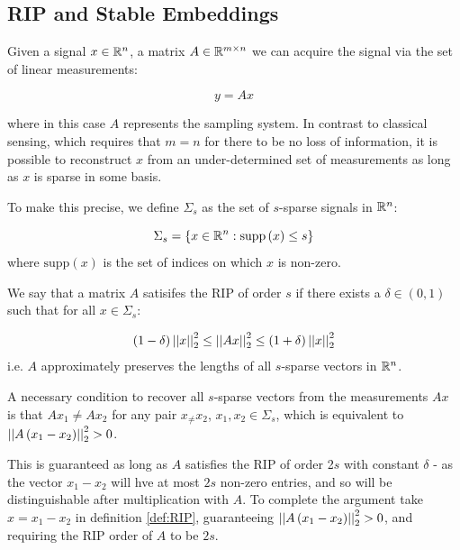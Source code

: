 \documentclass{article}
\begin{document}
\subsection{RIP and Stable Embeddings}
Given a signal \(x \in {\mathbb{R}}^n\), a matrix \(A \in {\mathbb{R}}^{m \times n}\) we can acquire the signal via the set of linear measurements:

\begin{equation}
y = Ax
\end{equation}

where in this case \(A\) represents the sampling system. In contrast to classical sensing, which requires that \(m = n\) for there to be no loss of information, it is possible to reconstruct \(x\) from an under-determined set of measurements as long as \(x\) is sparse in some basis. 

To make this precise, we define \(\Sigma_s\) as the set of \(s\)-sparse signals in \({\mathbb{R}}^n\):

\begin{definition}
\begin{equation}
\Sigma_s = \{ x \in {\mathbb{R}}^n : \mathrm{supp}\left(x\right) \leq s\}
\end{equation}
where \(\mathrm{supp}\left(x\right) \) is the set of indices on which \(x\) is non-zero.
\end{definition}

\begin{definition}[RIP]
We say that a matrix \(A\) satisifes the RIP of order \(s\) if there exists a \(\delta \in \left(0, 1\right)\) such that for all \(x \in \Sigma_s\):

\begin{equation}
\left(1 - \delta\right) \left|\left|x\right|\right|_2^2 \leq \left|\left|Ax\right|\right|_2^2 \leq \left(1 + \delta\right) \left|\left|x\right|\right|_2^2
\end{equation}
i.e. \(A\) approximately preserves the lengths of all \(s\)-sparse vectors in \({\mathbb{R}}^n\). 
\label{def:RIP}
\end{definition}

\begin{remark} 
A necessary condition to recover all \(s\)-sparse vectors from the measurements \(Ax\) is that \(Ax_1 \neq Ax_2\) for any pair \( x_ \neq x_2\), \(x_1, x_2 \in \Sigma_s\), which is equivalent to \(\left|\left|A\left(x_1 - x_2\right)\right|\right|_2^2 > 0\). 

This is guaranteed as long as \(A\) satisfies the RIP of order 2\(s\) with constant \(\delta\) - as the vector \(x_1 - x_2\) will hve at most \(2s\) non-zero entries, and so will be distinguishable after multiplication with \(A\). To complete the argument take \(x = x_1 - x_2\) in definition \eqref{def:RIP}, guaranteeing \(\left|\left|A\left(x_1 - x_2\right)\right|\right|_2^2 > 0 \), and requiring the RIP order of \(A\) to be \(2s\).
\end{remark}
\end{document}
